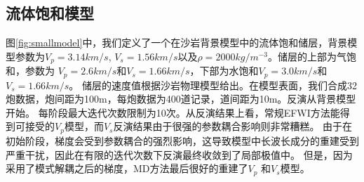 \subsection{流体饱和模型}
图\ref{fig:smallmodel}中，我们定义了一个在沙岩背景模型中的流体饱和储层，背景模型参数为$V_p=3.14 km/s$, $V_s=1.56 km/s$以及$\rho=2000 kg/m^{-3}$。储层的上部为气饱和，参数为
$V_p=2.6 km/s$和$V_s=1.66 km/s$，下部为水饱和$V_p=3.0 km/s$和$V_s=1.66 km/s$。
储层的速度值根据沙岩物理模型给出\cite[]{mavko2009rock}。在模型表面，我们合成32炮数据，炮间距为100m，每炮数据为400道记录，道间距为10m。反演从背景模型开始。
每阶段最大迭代次数限制为10次。从反演结果上看，常规EFWI方法能得到可接受的$V_p$模型，而$V_s$反演结果由于很强的参数耦合影响则非常糟糕。
由于在初始阶段，梯度会受到参数耦合的强烈影响，这导致模型中长波长成分的重建受到严重干扰，因此在有限的迭代次数下反演最终收敛到了局部极值中。
但是，因为采用了模式解耦之后的梯度，MD方法最后很好的重建了$V_p$ 和$V_s$模型。
